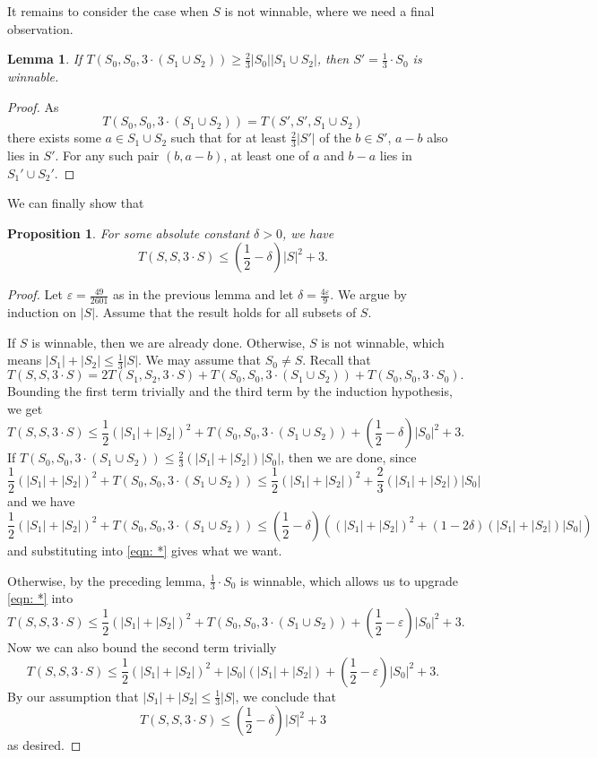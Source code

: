 \documentclass[12pt, notitlepage]{amsart}
\numberwithin{equation}{section}
\newtheorem{lemma}[theorem]{Lemma}
\newtheorem{proposition}[theorem]{Proposition}
\theoremstyle{remark}
\theoremstyle{definition}
\theoremstyle{remark}
\numberwithin{equation}{section}
\begin{document}
It remains to consider the case when $S$ is not winnable, where we need a final observation.
\begin{lemma}
If $T(S_0, S_0, 3 \cdot (S_1 \cup S_2)) \geq \frac{2}{3} |S_0| |S_1 \cup S_2|$, then $S' = \frac{1}{3} \cdot S_0$ is winnable.   
\end{lemma}
\begin{proof}
    As
    $$T(S_0, S_0, 3 \cdot (S_1 \cup S_2)) = T\left(S', S', S_1 \cup S_2\right)$$
    there exists some $a \in  S_1 \cup S_2$ such that for at least $\frac{2}{3} |S'|$ of the $b \in S'$, $a - b$ also lies in $S'$. For any such pair $(b, a - b)$, at least one of $a$ and $b - a$ lies in $S_1' \cup S_2'$.
\end{proof}
We can finally show that
\begin{proposition}
    For some absolute constant $\delta > 0$, we have
    $$T(S, S, 3 \cdot S) \leq \left(\frac{1}{2} - \delta\right) |S|^2 + 3.$$
\end{proposition}
\begin{proof} Let $\varepsilon = \frac{49}{2601}$ as in the previous lemma and let $\delta=\frac{4\varepsilon}{9}$. We argue by induction on $|S|$. Assume that the result holds for all subsets of $S$.

    If $S$ is winnable, then we are already done. Otherwise, $S$ is not winnable, which means $|S_1| + |S_2| \leq \frac{1}{3} |S|$. We may assume that $S_0\neq S$. Recall that
    $$T(S, S, 3 \cdot S) = 2 T(S_1, S_2, 3 \cdot S) + T(S_0, S_0, 3 \cdot (S_1 \cup S_2)) + T(S_0, S_0, 3 \cdot S_0).$$
    Bounding the first term trivially and the third term by the induction hypothesis, we get
    \begin{equation}\label{eqn: *}
       T(S, S, 3 \cdot S) \le \frac{1}{2} (|S_1| + |S_2|)^2 + T(S_0, S_0, 3 \cdot (S_1 \cup S_2)) + \left(\frac{1}{2} - \delta\right) |S_0|^2 + 3. 
    \end{equation}
    If $T(S_0, S_0, 3 \cdot (S_1 \cup S_2)) \leq \frac{2}{3} (|S_1| + |S_2|) |S_0|$, then we are done, since
    $$\frac{1}{2} (|S_1| + |S_2|)^2 + T(S_0, S_0, 3 \cdot (S_1 \cup S_2)) \leq \frac{1}{2} (|S_1| + |S_2|)^2 + \frac{2}{3} (|S_1| + |S_2|) |S_0|$$
    and we have
    $$\frac{1}{2} (|S_1| + |S_2|)^2 + T(S_0, S_0, 3 \cdot (S_1 \cup S_2)) \leq (\frac{1}{2} - \delta)((|S_1| + |S_2|)^2 + (1-2\delta)(|S_1| + |S_2|) |S_0|)$$
    and substituting into \eqref{eqn: *} gives what we want.
    
    Otherwise, by the preceding lemma, $\frac{1}{3} \cdot S_0$ is winnable, which allows us to upgrade \eqref{eqn: *} into
    $$T(S, S, 3 \cdot S) \le \frac{1}{2} (|S_1| + |S_2|)^2 + T(S_0, S_0, 3 \cdot (S_1 \cup S_2)) + \left(\frac{1}{2} - \varepsilon\right) |S_0|^2 + 3.$$
    Now we can also bound the second term trivially
    $$T(S, S, 3 \cdot S) \le \frac{1}{2} (|S_1| + |S_2|)^2 + |S_0|(|S_1| + |S_2|) + \left(\frac{1}{2} - \varepsilon\right) |S_0|^2 + 3.$$
    By our assumption that $|S_1| + |S_2| \leq \frac{1}{3} |S|$, we conclude that
    $$T(S, S, 3 \cdot S) \le \left(\frac{1}{2} - \delta\right) |S|^2 + 3$$
    as desired.
\end{proof}
\end{document}

